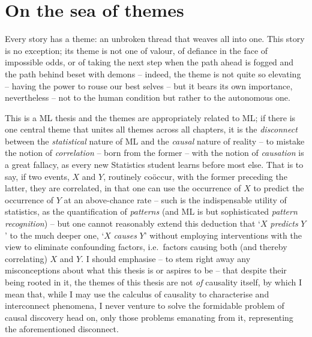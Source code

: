 \section*{On the sea of themes}\label{sec:themes}
Every story has a theme: an unbroken thread that weaves all into one.
%
This story is no exception; its theme is not one of valour, of defiance in the face of impossible
odds, or of taking the next step when the path ahead is fogged and the path behind beset with
demons -- indeed, the theme is not quite so elevating -- having the power to rouse our best selves
-- but it bears its own importance, nevertheless -- not to the human condition but rather to the
autonomous one.

%
%
This is a \ac{ML} thesis and the themes are appropriately related to \ac{ML}; if there is
one central theme that unites all themes across all chapters, it is the \emph{disconnect} between
the \emph{statistical} nature of \ac{ML} and the \emph{causal} nature of reality -- to mistake the
notion of \emph{correlation} -- born from the former -- with the notion of \emph{causation} is a
great fallacy, as every new Statistics student learns before most else.
%
That is to say, if two events, \(X\) and \(Y\), routinely co{\"o}ccur, with the former preceding
the latter, they are correlated, in that one can use the occurrence of \(X\) to predict the
occurrence of \(Y\) at an above-chance rate -- such is the indispensable utility of statistics, as
the quantification of \emph{patterns} (and \ac{ML} is but sophisticated \emph{pattern recognition})
-- but one cannot reasonably extend this deduction that `\(X\) \emph{predicts} \(Y\)' to the much
deeper one, `\(X\) \emph{causes} \(Y\)' without employing interventions with the view to eliminate
confounding factors, i.e.\ factors causing both (and thereby correlating) \(X\) and \(Y\).
%
I should emphasise -- to stem right away any misconceptions about what this thesis is or aspires to
be -- that despite their being rooted in it, the themes of this thesis are not \emph{of} causality
itself, by which I mean that, while I may use the calculus of causality to characterise and
interconnect phenomena, I never venture to solve the formidable problem of causal discovery head
on, only those problems emanating from it, representing the aforementioned disconnect.
%

